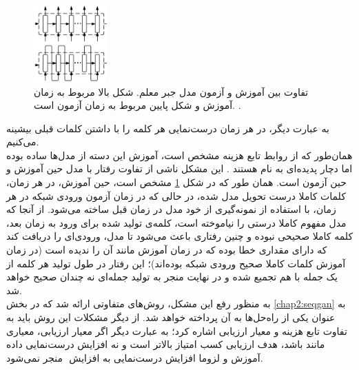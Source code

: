 \begin{figure}[H]
	\centering
	\includegraphics[width=0.25\textwidth]{images/teach-prof.png}
	\caption{
		تفاوت بین آموزش و آزمون مد‌ل جبر معلم. شکل بالا مربوط به زمان آموزش و شکل پایین مربوط به زمان آزمون است. \cite{prof_force}.}
	\label{fig:chap2:expbias}
\end{figure}

به عبارت دیگر، در هر زمان درست‌نمایی هر کلمه را با داشتن کلمات قبلی بیشینه می‌کنیم. \\
همان‌طور که از روابط تابع هزینه مشخص است، آموزش این دسته از مدل‌ها ساده بوده اما دچار پدیده‌ای به نام 
 هستند \cite{ prof_force, s_sampling}. این مشکل ناشی از تفاوت رفتار با مدل حین آموزش و حین آزمون است. همان طور که در شکل \ref{fig:chap2:expbias} مشخص است، حین آموزش، در هر زمان، کلمات کاملا درست تحویل مدل شده، در حالی که در زمان آزمون ورودی شبکه در هر زمان، با استفاده از نمونه‌گیری از خود مدل در زمان قبل ساخته می‌شود. از آنجا که مدل مفهوم کاملا درستی را نیاموخته است، کلمه‌ی تولید شده برای ورود به زمان بعد، کلمه کاملا صحیحی نبوده و چنین رفتاری باعث می‌شود تا مدل، ورودی‌ای را دریافت کند که دارای مقداری خطا بوده که در زمان آموزش مانند آن را ندیده است (در زمان آموزش کلمات کاملا صحیح ورودی شبکه بوده‌اند)؛ این رفتار در طول تولید هر کلمه از یک جمله با هم تجمیع شده و در نهایت منجر به تولید جمله‌ای نه چندان صحیح خواهد شد.\\
به منظور رفع این مشکل، روش‌های متفاوتی ارائه شد \cite{prof_force, s_sampling, seqgan} که در بخش \ref{chap2:seqgan} به عنوان یکی از راه‌حل‌ها به آن پرداخته خواهد شد.
از دیگر مشکلات این روش باید به تفاوت تابع هزینه و معیار ارزیابی اشاره کرد؛ به عبارت دیگر اگر معیار ارزیابی، معیاری مانند  باشد، هدف ارزیابی کسب امتیاز بالاتر  است و نه افزایش درست‌نمایی داده آموزش و لزوما افزایش درست‌نمایی به افزایش ‌ منجر نمی‌شود.
